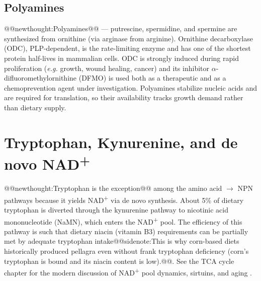 \documentclass{tufte-handout}
\makeatletter
\def\newthought#1{@@newthought:#1@@}
\def\sidenote#1{@@sidenote:#1@@}
\makeatother
\begin{document}
\subsection{Polyamines}
\newthought{Polyamines} --- putrescine, spermidine, and spermine are synthesized from ornithine (via arginase from arginine). Ornithine decarboxylase (ODC), PLP-dependent, is the rate-limiting enzyme and has one of the shortest protein half-lives in mammalian cells. ODC is strongly induced during rapid proliferation (\textit{e.g.} growth, wound healing, cancer) and its inhibitor $\alpha$-difluoromethylornithine (DFMO) is used both as a therapeutic and as a chemoprevention agent under investigation. Polyamines stabilize nucleic acids and are required for translation, so their availability tracks growth demand rather than dietary supply.

\section{Tryptophan, Kynurenine, and de novo NAD\textsuperscript{+}}\label{sec:kynurenine-nad}
\newthought{Tryptophan is the exception} among the amino acid $\rightarrow$ NPN pathways because it yields NAD\textsuperscript{+} via de novo synthesis. About 5\% of dietary tryptophan is diverted through the kynurenine pathway to nicotinic acid mononucleotide (NaMN), which enters the NAD\textsuperscript{+} pool. The efficiency of this pathway is such that dietary niacin (vitamin B3) requirements can be partially met by adequate tryptophan intake\sidenote{This is why corn-based diets historically produced pellagra\index{Diseases!Pellagra} even without frank tryptophan deficiency (corn's tryptophan is bound and its niacin content is low).}. See the TCA cycle chapter for the modern discussion of NAD\textsuperscript{+} pool dynamics, sirtuins, and aging \citep{covarrubiasNADMetabolismIts2021}.
\end{document}
